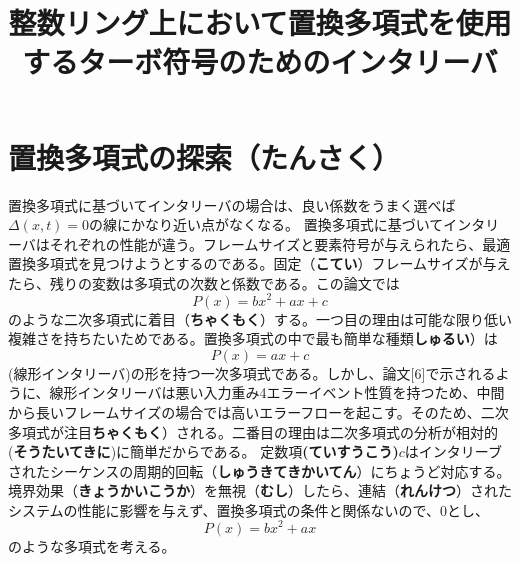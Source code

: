 \documentclass[24 pts]{article}
\title{整数リング上において置換多項式を使用するターボ符号のためのインタリーバ}
\date{}
\begin{document}
\maketitle

\section{置換多項式の探索（\textbf{たんさく}）}
置換多項式に基づいてインタリーバの場合は、良い係数をうまく選べば$\Delta(x,t)=0$の線にかなり近い点がなくなる。
置換多項式に基づいてインタリーバはそれぞれの性能が違う。フレームサイズと要素符号が与えられたら、最適置換多項式を見つけようとするのである。固定（\textbf{こてい}）フレームサイズが与えたら、残りの変数は多項式の次数と係数である。この論文では$$P(x)= bx^2+ax+c$$のような二次多項式に着目（\textbf{ちゃくもく}）する。一つ目の理由は可能な限り低い複雑さを持ちたいためである。置換多項式の中で最も簡単な種類\textbf{しゅるい}）は$$P(x)=ax+c$$(線形インタリーバ)の形を持つ一次多項式である。しかし、論文[6]で示されるように、線形インタリーバは悪い入力重み4エラーイベント性質を持つため、中間から長いフレームサイズの場合では高いエラーフローを起こす。そのため、二次多項式が注目\textbf{ちゃくもく}）される。二番目の理由は二次多項式の分析が相対的(\textbf{そうたいてきに})に簡単だからである。
定数項\textbf{(ていすうこう)}$c$はインタリーブされたシーケンスの周期的回転（\textbf{しゅうきてきかいてん}）にちょうど対応する。境界効果（\textbf{きょうかいこうか}）を無視（\textbf{むし}）したら、連結（\textbf{れんけつ}）されたシステムの性能に影響を与えず、置換多項式の条件と関係ないので、$0$とし、
$$P(x)= bx^2+ax$$のような多項式を考える。
\end{document}
